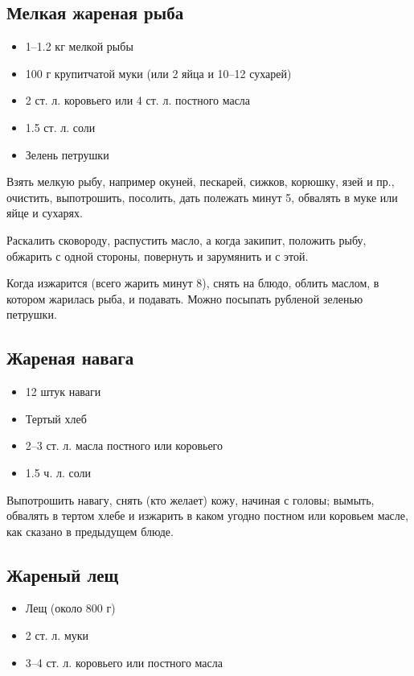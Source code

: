 \subsection{Мелкая жареная рыба}

\begin{itemize}
	\item 1–1.2 кг мелкой рыбы 
	\item 100 г крупитчатой муки (или 2 яйца и 10–12 сухарей) 
	\item 2 ст. л. коровьего или 4 ст. л. постного масла 
	\item 1.5 ст. л. соли 
	\item Зелень петрушки
\end{itemize}

Взять мелкую рыбу, например окуней, пескарей, сижков, корюшку, язей и пр., очистить, выпотрошить, посолить, дать полежать минут 5, обвалять в муке или яйце и сухарях.

Раскалить сковороду, распустить масло, а когда закипит, положить рыбу, обжарить с одной стороны, повернуть и зарумянить и с этой.

Когда изжарится (всего жарить минут 8), снять на блюдо, облить маслом, в котором жарилась рыба, и подавать. Можно посыпать рубленой зеленью петрушки.

\subsection{Жареная навага}

\begin{itemize}
	\item 12 штук наваги 
    \item  Тертый хлеб 
    \item  2–3 ст. л. масла постного или коровьего 
    \item  1.5 ч. л. соли
\end{itemize}

Выпотрошить навагу, снять (кто желает) кожу, начиная с головы; вымыть, обвалять в тертом хлебе и изжарить в каком угодно постном или коровьем масле, как сказано в предыдущем блюде.

\subsection{Жареный лещ}

\begin{itemize} 
	\item  Лещ (около 800 г) 
    \item  2 ст. л. муки 
    \item  3–4 ст. л. коровьего или постного масла
\end{itemize}

